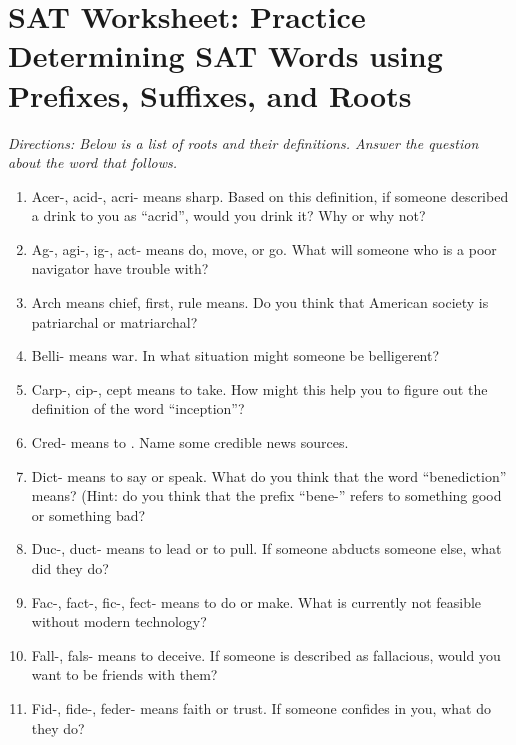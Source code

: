\section{SAT Worksheet: Practice Determining SAT Words using Prefixes, Suffixes, and Roots}

\textit{Directions: Below is a list of roots and their definitions. Answer the question about the word that follows.}

\begin{enumerate}
\item Acer-, acid-, acri- means sharp. Based on this definition, if someone described a drink to you as ``acrid'', would you drink it? Why or why not? \hrulefill

\item Ag-, agi-, ig-, act- means do, move, or go. What will someone who is a poor navigator have trouble with? \hrulefill


\item Arch means chief, first, rule means. Do you think that American society is patriarchal or matriarchal? \hrulefill


\item Belli- means war. In what situation might someone be belligerent? \hrulefill

\item Carp-, cip-, cept means to take. How might this help you to figure out the definition of the word ``inception''? \hrulefill

\item Cred- means to \hrulefill. Name some credible news sources. \hrulefill

\item Dict- means to say or speak. What do you think that the word ``benediction'' means? \hrulefill (Hint: do you think that the prefix ``bene-'' refers to something good or something bad? \hrulefill

\item Duc-, duct- means to lead or to pull. If someone abducts someone else, what did they do? \hrulefill

\item Fac-, fact-, fic-, fect- means to do or make. What is currently not feasible without modern technology? \hrulefill

\item Fall-, fals- means to deceive. If someone is described as fallacious, would you want to be friends with them? \hrulefill

\item Fid-, fide-, feder- means faith or trust. If someone confides in you, what do they do? \hrulefill


\end{enumerate}
